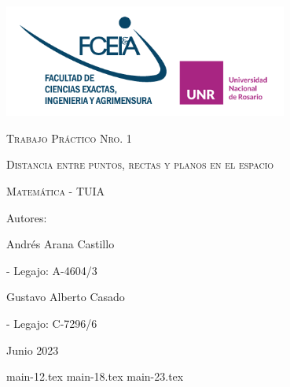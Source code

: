 \documentclass[a4paper,12pt]{article}
\begin{document}
\begin{titlepage}
	\centering
	\vspace{1cm}
	{\includegraphics[width=0.7\textwidth]{FCEIA-logo.png}\par}
	\vspace{2cm}
	{\scshape\Huge Trabajo Práctico Nro. 1 \par}
	\vspace{1cm}
	{\scshape\Large Distancia entre puntos, rectas y planos en el espacio \par}
	\vspace{3cm}
	{\scshape\Large Matemática - TUIA \par}
	\vfill
	{\Large Autores: \par}
	\vspace{0.3cm}
	{\Large Andrés Arana Castillo}
	{\normalsize - Legajo: A-4604/3 \par}
	{\Large Gustavo Alberto Casado}
	{\normalsize - Legajo: C-7296/6 \par}
	\vfill
	{\Large Junio 2023 \par}
\end{titlepage}

\tableofcontents

{main-12.tex}
{main-18.tex}
{main-23.tex}
\end{document}
